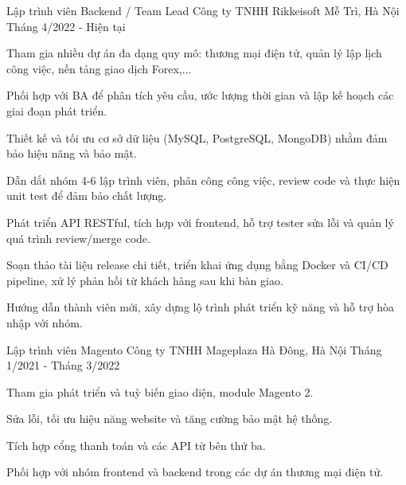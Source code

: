 

\begin{cventries}

  \cventry
    {Lập trình viên Backend / Team Lead} %
    {Công ty TNHH Rikkeisoft} %
    {Mễ Trì, Hà Nội} %
    {Tháng 4/2022 - Hiện tại} %
    {
      \begin{cvitems} %
        \item {Tham gia nhiều dự án đa dạng quy mô: thương mại điện tử, quản lý lập lịch công việc, nền tảng giao dịch Forex,...}
        \item {Phối hợp với BA để phân tích yêu cầu, ước lượng thời gian và lập kế hoạch các giai đoạn phát triển.}
        \item {Thiết kế và tối ưu cơ sở dữ liệu (MySQL, PostgreSQL, MongoDB) nhằm đảm bảo hiệu năng và bảo mật.}
        \item {Dẫn dắt nhóm 4-6 lập trình viên, phân công công việc, review code và thực hiện unit test để đảm bảo chất lượng.}
        \item {Phát triển API RESTful, tích hợp với frontend, hỗ trợ tester sửa lỗi và quản lý quá trình review/merge code.}
        \item {Soạn thảo tài liệu release chi tiết, triển khai ứng dụng bằng Docker và CI/CD pipeline, xử lý phản hồi từ khách hàng sau khi bàn giao.}
        \item {Hướng dẫn thành viên mới, xây dựng lộ trình phát triển kỹ năng và hỗ trợ hòa nhập với nhóm.}
      \end{cvitems}
    }

  \cventry
    {Lập trình viên Magento} %
    {Công ty TNHH Mageplaza} %
    {Hà Đông, Hà Nội} %
    {Tháng 1/2021 - Tháng 3/2022} %
    {
      \begin{cvitems} %
        \item {Tham gia phát triển và tuỳ biến giao diện, module Magento 2.}
        \item {Sửa lỗi, tối ưu hiệu năng website và tăng cường bảo mật hệ thống.}
        \item {Tích hợp cổng thanh toán và các API từ bên thứ ba.}
        \item {Phối hợp với nhóm frontend và backend trong các dự án thương mại điện tử.}
      \end{cvitems}
    }

\end{cventries}
